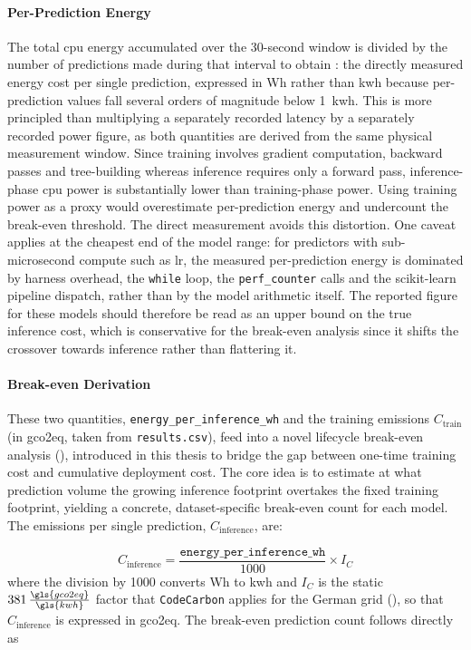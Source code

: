 \paragraph{Per-Prediction Energy}
The total \gls{cpu} energy accumulated over the 30-second window is divided by the number of predictions made during that interval to obtain : the directly measured energy cost per single prediction, expressed in Wh rather than \gls{kwh} because per-prediction values fall several orders of magnitude below 1~\gls{kwh}. This is more principled than multiplying a separately recorded latency by a separately recorded power figure, as both quantities are derived from the same physical measurement window. Since training involves gradient computation, backward passes and tree-building whereas inference requires only a forward pass, inference-phase \gls{cpu} power is substantially lower than training-phase power. Using training power as a proxy would overestimate per-prediction energy and undercount the break-even threshold. The direct measurement avoids this distortion. One caveat applies at the cheapest end of the model range: for predictors with sub-microsecond compute such as \gls{lr}, the measured per-prediction energy is dominated by harness overhead, the \texttt{while} loop, the \texttt{perf\_counter} calls and the scikit-learn pipeline dispatch, rather than by the model arithmetic itself. The reported figure for these models should therefore be read as an upper bound on the true inference cost, which is conservative for the break-even analysis since it shifts the crossover towards inference rather than flattering it.

\paragraph{Break-even Derivation}
These two quantities, \texttt{energy\_per\_inference\_wh} and the training emissions $C_{\text{train}}$ (in \gls{gco2eq}, taken from \texttt{results.csv}), feed into a novel lifecycle break-even analysis (), introduced in this thesis to bridge the gap between one-time training cost and cumulative deployment cost. The core idea is to estimate at what prediction volume the growing inference footprint overtakes the fixed training footprint, yielding a concrete, dataset-specific break-even count for each model. The emissions per single prediction, $C_{\text{inference}}$, are:

\begin{equation}
C_{\text{inference}} = \frac{\texttt{energy\_per\_inference\_wh}}{1000} \times I_C
\label{eq:co2_per_inference}
\end{equation}
where the division by 1000 converts Wh to \gls{kwh} and $I_C$ is the static $381\,\frac{\gls{gco2eq}}{\gls{kwh}}$ factor that \texttt{CodeCarbon} applies for the German grid (), so that $C_{\text{inference}}$ is expressed in \gls{gco2eq}.
The break-even prediction count follows directly as

